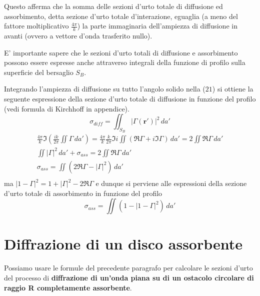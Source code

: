 
Questo afferma che la somma delle sezioni d'urto totale di diffusione ed
assorbimento, detta sezione d'urto totale d'interazione, eguaglia (a
meno del fattore moltiplicativo \(\frac{4 \pi}{k}\)) la parte
immaginaria dell'ampiezza di diffusione in avanti (ovvero a vettore
d'onda trasferito nullo).

E' importante sapere che le sezioni d'urto totali di diffusione e
assorbimento possono essere espresse anche attraverso integrali della
funzione di profilo sulla superficie del bersaglio \(S_B\).

Integrando l'ampiezza di diffusione su tutto l'angolo solido nella
(\(21\)) si ottiene la seguente espressione della sezione d'urto totale
di diffusione in funzione del profilo (vedi formula di Kirchhoff in
appendice).
\begin{equation}
	\sigma_{diff} = \iint_{S_B} |\Gamma(\bm{r}')|^2 \, da'
\end{equation}
\begin{gather*}
	\frac{4 \pi}{k} \Im \left(\frac{ik}{2 \pi} \iint \Gamma \, da' \right) =
	\frac{4 \pi}{k} \frac{k}{2 \pi} \Im i \iint(\Re \Gamma +i \Im \Gamma) \, da' =   2 \iint \Re \Gamma \, da'\\
	\iint |\Gamma|^2 \, da' + \sigma_{ass} = 2 \iint \Re \Gamma \, da'\\
	\sigma_{ass} = \iint (2 \Re \Gamma - |\Gamma|^2) \, da'\\
\end{gather*} ma $|1 - \Gamma|^2 = 1 + |\Gamma|^2 - 2 \Re \Gamma$ e dunque si perviene alle espressioni della sezione d'urto totale di assorbimento in funzione del profilo \begin{equation}
	\boxed{ \sigma_{ass} = \iint \left(1 - |1 - \Gamma|^2 \right) \, da' }
\end{equation}
\section{Diffrazione di un disco assorbente}\label{sec:diffrazione-di-un-disco-assorbente}

Possiamo usare le formule del precedente paragrafo per calcolare le
sezioni d'urto del processo di \textbf{diffrazione di un'onda piana su
di un ostacolo circolare di raggio R completamente assorbente}.

